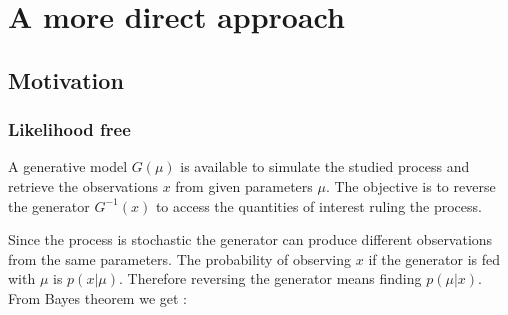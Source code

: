 
\chapter{A more direct approach}
\label{chap:direct_approach}

\ifpdf
    \graphicspath{{Chapter3/Figs/Raster/}{Chapter3/Figs/PDF/}{Chapter3/Figs/}}
\else
    \graphicspath{{Chapter3/Figs/Vector/}{Chapter3/Figs/}}
\fi






\section{Motivation} %
\label{sec:motivation}








\subsection{Likelihood free} %
\label{sub:likelihood_free}


A generative model $G(\mu)$ is available to simulate the studied process and retrieve the observations $x$ from given parameters $\mu$.
The objective is to reverse the generator $G^{-1}(x)$ to access the quantities of interest ruling the process.

Since the process is stochastic the generator can produce different observations from the same parameters.
The probability of observing $x$ if the generator is fed with $\mu$ is $p(x | \mu)$.
Therefore reversing the generator means finding $p(\mu | x)$.
From Bayes theorem we get :

